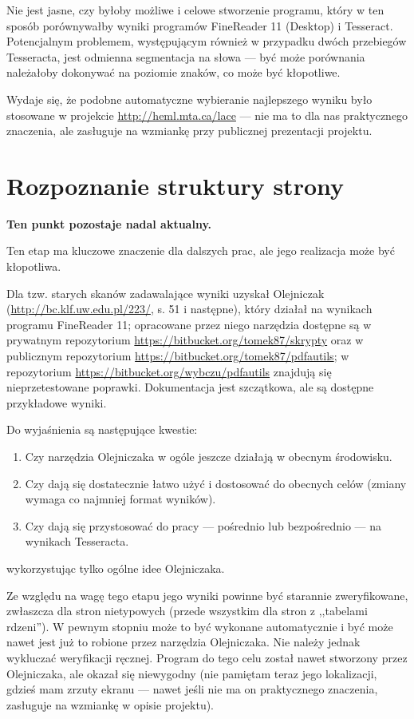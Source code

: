 \documentclass[12]{mwart}
\newcommand{\program}[1]{\textsf{#1}}
\begin{document}
Nie jest jasne, czy byłoby możliwe i celowe stworzenie programu, który
w ten sposób porównywałby wyniki programów \program{FineReader 11}
(Desktop) i \program{Tesseract}. Potencjalnym problemem, występującym
również w przypadku dwóch przebiegów \program{Tesseracta}, jest
odmienna segmentacja na słowa --- być może porównania należałoby
dokonywać na poziomie znaków, co może być kłopotliwe.

Wydaje się, że podobne automatyczne wybieranie najlepszego wyniku było
stosowane w projekcie \url{http://heml.mta.ca/lace} --- nie ma to dla
nas praktycznego znaczenia, ale zasługuje na wzmiankę przy publicznej
prezentacji projektu.

\section{Rozpoznanie struktury strony}
\label{sec:rozp-strukt-strony}

\textbf{Ten punkt pozostaje nadal aktualny.}

Ten etap ma kluczowe znaczenie dla dalszych prac, ale jego realizacja
może być kłopotliwa.


Dla tzw. starych skanów zadawalające wyniki uzyskał Olejniczak
(\url{http://bc.klf.uw.edu.pl/223/}, s. 51 i następne), który działał
na wynikach programu \program{FineReader 11}; opracowane przez niego
narzędzia dostępne są w prywatnym repozytorium
\url{https://bitbucket.org/tomek87/skrypty} oraz w publicznym
repozytorium \url{https://bitbucket.org/tomek87/pdfautils}; w
repozytorium \url{https://bitbucket.org/wybczu/pdfautils} znajdują się
nieprzetestowane poprawki. Dokumentacja jest szczątkowa, ale są
dostępne przykładowe wyniki.

Do wyjaśnienia są następujące kwestie:
\begin{enumerate}
\item Czy narzędzia Olejniczaka w ogóle jeszcze działają w obecnym środowisku.
\item Czy dają się dostatecznie łatwo użyć i dostosować do obecnych
  celów (zmiany wymaga co najmniej format wyników).
\item Czy dają się przystosować do pracy --- pośrednio lub
  bezpośrednio --- na wynikach \program{Tesseracta}.
\end{enumerate}
wykorzystując tylko ogólne idee Olejniczaka.

Ze względu na wagę tego etapu jego wyniki powinne być starannie
zweryfikowane, zwłaszcza dla stron nietypowych (przede wszystkim dla
stron z ,,tabelami rdzeni''). W pewnym stopniu może to być wykonane
automatycznie i być może nawet jest już to robione przez narzędzia
Olejniczaka. Nie należy jednak wykluczać weryfikacji ręcznej. Program
do tego celu został nawet stworzony przez Olejniczaka, ale okazał się
niewygodny (nie pamiętam teraz jego lokalizacji, gdzieś mam zrzuty
ekranu --- nawet jeśli nie ma on praktycznego znaczenia, zasługuje na
wzmiankę w opisie projektu).
\end{document}

